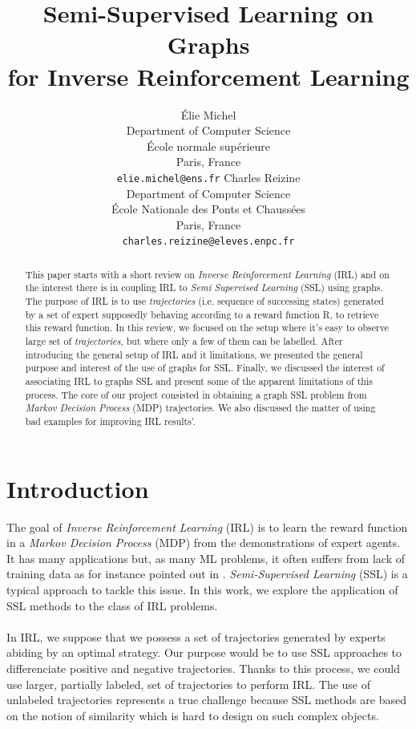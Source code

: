 \documentclass{article}
\title{Semi-Supervised Learning on Graphs \\
for Inverse Reinforcement Learning}
\author{
Élie Michel\\
Department of Computer Science\\
École normale supérieure\\
Paris, France\\
\texttt{elie.michel@ens.fr}
\And
Charles Reizine\\
Department of Computer Science\\
École Nationale des Ponts et Chaussées\\
Paris, France\\
\texttt{charles.reizine@eleves.enpc.fr}
}
\begin{document}
\maketitle

\begin{abstract}
This paper starts with a short review on \emph{Inverse Reinforcement Learning} (IRL) and on the interest there is in coupling IRL to \emph{Semi Supervised Learning} (SSL) using graphs. The purpose of IRL is to use  \emph{trajectories} (i.e. sequence of successing states) generated by a set of expert supposedly behaving according to a reward function R, to retrieve this reward function. In this review, we focused on the setup where it's easy to observe large set of \emph{trajectories}, but where only a few of them can be labelled. After introducing the general setup of IRL and it limitations, we presented the general purpose and interest of the use of graphs for SSL. Finally, we discussed the interest of associating IRL to graphs SSL and present some of the apparent limitations of this process. The core of our project consisted in obtaining a graph SSL problem from \emph{Markov Decision Process} (MDP) trajectories. We also discussed the matter of using bad examples for improving IRL results'.
\end{abstract}

\section{Introduction}

The goal of \emph{Inverse Reinforcement Learning} (IRL) is to learn the reward function in a \emph{Markov Decision Process} (MDP) from the demonstrations of expert agents. It has many applications \cite{Kaelbling96} but, as many ML problems, it often suffers from lack of training data as for instance pointed out in \cite{Vasquez14}. \emph{Semi-Supervised Learning} (SSL) is a typical approach to tackle this issue. In this work, we explore the application of SSL methods to the class of IRL problems.
\paragraph{}
In IRL, we suppose that we possess a set of trajectories generated by experts abiding by an optimal strategy. Our purpose would be to use SSL approaches to differenciate positive and negative trajectories. Thanks to this process, we could use larger, partially labeled, set of trajectories to perform IRL. The use of unlabeled trajectories represents a true challenge because SSL methods are based on the notion of similarity which is hard to design on such complex objects.
\end{document}
